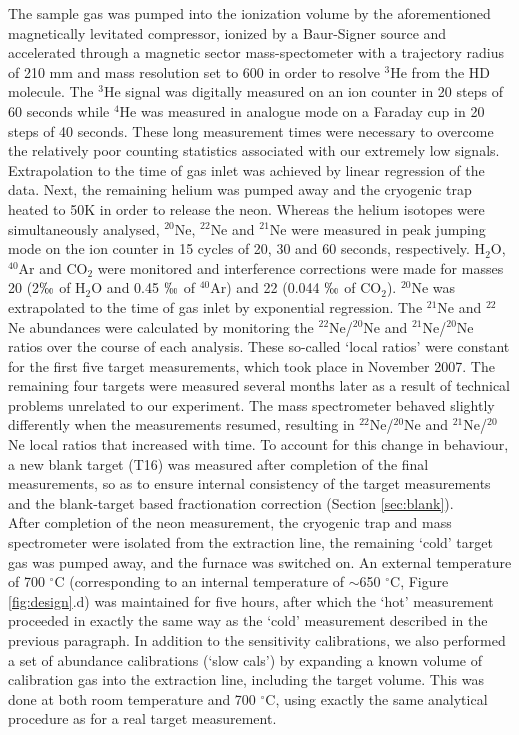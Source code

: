 \documentclass{article}
\begin{document}
The  sample  gas  was  pumped   into  the  ionization  volume  by  the
aforementioned  magnetically   levitated  compressor,  ionized   by  a
Baur-Signer source \citep{baur1980} and accelerated through a magnetic
sector mass-spectometer  with a trajectory  radius of 210 mm  and mass
resolution set to 600 in order to resolve $^3$He from the HD molecule.
The $^3$He signal was digitally measured on an ion counter in 20 steps
of 60 seconds while $^4$He was  measured in analogue mode on a Faraday
cup  in 20 steps  of 40  seconds.  These  long measurement  times were
necessary  to   overcome  the  relatively   poor  counting  statistics
associated with our extremely  low signals.  Extrapolation to the time
of gas inlet was achieved by linear regression of the data.  Next, the
remaining helium was pumped away  and the cryogenic trap heated to 50K
in  order to  release  the  neon.  Whereas  the  helium isotopes  were
simultaneously  analysed,  $^{20}$Ne,  $^{22}$Ne  and  $^{21}$Ne  were
measured in peak  jumping mode on the ion counter in  15 cycles of 20,
30 and  60 seconds, respectively.   H$_2$O, $^{40}$Ar and  CO$_2$ were
monitored  and  interference  corrections  were  made  for  masses  20
(2$\permil$ of H$_2$O  and 0.45 $\permil$ of $^{40}$Ar)  and 22 (0.044
$\permil$ of CO$_2$).   $^{20}$Ne was extrapolated to the  time of gas
inlet  by   exponential  regression.   The   $^{21}$Ne  and  $^{22}$Ne
abundances were  calculated by monitoring  the $^{22}$Ne/$^{20}$Ne and
$^{21}$Ne/$^{20}$Ne ratios  over the  course of each  analysis.  These
so-called  `local ratios'  were  constant for  the  first five  target
measurements, which  took place in November 2007.   The remaining four
targets were  measured several months  later as a result  of technical
problems unrelated  to our experiment.  The  mass spectrometer behaved
slightly  differently  when  the  measurements resumed,  resulting  in
$^{22}$Ne/$^{20}$Ne   and   $^{21}$Ne/$^{20}$Ne   local  ratios   that
increased with time.   To account for this change  in behaviour, a new
blank  target  (T16)  was  measured  after  completion  of  the  final
measurements,  so as  to  ensure internal  consistency  of the  target
measurements  and  the  blank-target  based  fractionation  correction
(Section \ref{sec:blank}).  \\

After completion of the neon  measurement, the cryogenic trap and mass
spectrometer  were isolated  from the  extraction line,  the remaining
`cold' target  gas was pumped away,  and the furnace was  switched on. 
An  external  temperature  of  700 $^{\circ}$C  (corresponding  to  an
internal     temperature    of    $\sim$650     $^{\circ}$C,    Figure
\ref{fig:design}.d)  was maintained  for five  hours, after  which the
`hot'  measurement proceeded  in exactly  the same  way as  the `cold'
measurement described  in the previous paragraph.  In  addition to the
sensitivity  calibrations,  we  also  performed  a  set  of  abundance
calibrations (`slow cals') by  expanding a known volume of calibration
gas into the  extraction line, including the target  volume.  This was
done at both room temperature and 700 $^{\circ}$C, using exactly
the same analytical procedure as for a real target measurement.
\end{document}
